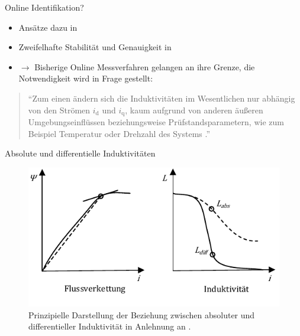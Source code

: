 \documentclass{beamer}
\newcommand{\x}[1]{\mathrm{#1}}
\begin{document}
\begin{frame}{Online Identifikation?}
	\begin{itemize}
		\item Ansätze dazu in \autocite{underwood_online_2010}
		\item Zweifelhafte Stabilität und Genauigkeit in \autocite{underwood_online_2010}
		\item $\rightarrow$ Bisherige Online Messverfahren gelangen an ihre Grenze, die Notwendigkeit wird in Frage gestellt:
	\end{itemize}
	
	\begin{quote}
		\enquote{Zum einen ändern sich die Induktivitäten im Wesentlichen nur abhängig von den Strömen $i_\x{d}$ und $i_\x{q}$, kaum aufgrund von anderen äußeren Umgebungseinflüssen beziehungsweise Prüfstandsparametern, wie zum Beispiel Temperatur oder Drehzahl des Systems \autocite[S.~79]{Kellner2012}.}
	\end{quote}
	
\end{frame}

\begin{frame}[plain]{Absolute und differentielle Induktivitäten}
	\begin{figure}[!h]
		\centering
		\includegraphics[width=\columnwidth]{img/induktiv}
		\caption{Prinzipielle Darstellung der Beziehung zwischen absoluter und differentieller Induktivität in Anlehnung an \textcite[S.~2]{kellner_general_2011}.}
		\label{fig:induktiv}
	\end{figure}
\end{frame}
\end{document}

